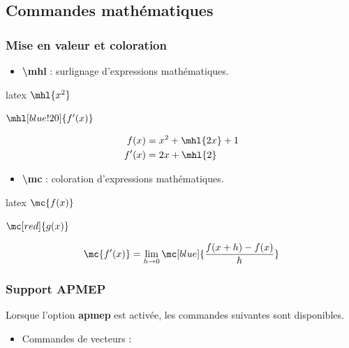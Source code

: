 \documentclass[
    french,
    margin=2cm
]{neoschool}
\begin{document}
\subsection{Commandes
mathématiques}\label{commandes-mathuxe9matiques}

\subsubsection{Mise en valeur et
coloration}\label{mise-en-valeur-et-coloration}

\begin{itemize}
\item
  \textbf{\textbackslash mhl} : surlignage d'expressions mathématiques.
\end{itemize}

\begin{code}{latex}
$\mhl{x^2}$

$\mhl[blue!20]{f'(x)}$

\begin{align*}
    f(x) &= x^2 + \mhl{2x} + 1 \\
    f'(x) &= 2x + \mhl{2}
\end{align*}
\end{code}

\begin{itemize}

\item
  \textbf{\textbackslash mc} : coloration d'expressions mathématiques.
\end{itemize}

\begin{code}{latex}
$\mc{f(x)}$

$\mc[red]{g(x)}$

\[ \mc{f'(x)} = \lim_{h \to 0} \mc[blue]{\frac{f(x+h)-f(x)}{h}} \]
\end{code}

\subsubsection{Support APMEP}

Lorsque l'option \textbf{apmep} est activée, les commandes suivantes sont disponibles.
\begin{itemize}
\item Commandes de vecteurs :
\end{itemize}
\end{document}
